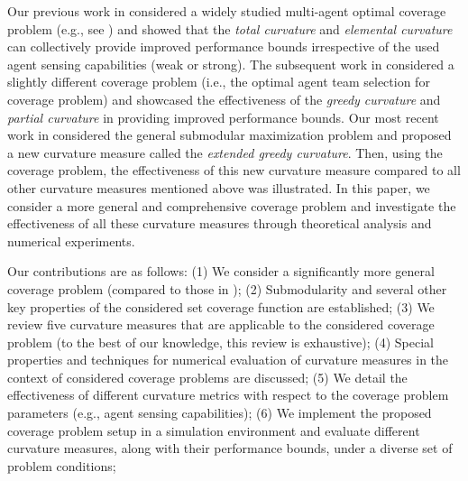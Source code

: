 \documentclass[letterpaper, 10 pt, conference]{ieeeconf}
\begin{document}
Our previous work in \cite{Sun2019} considered a widely studied multi-agent optimal coverage problem (e.g., see \cite{Zhong2011,Welikala2019J1}) and showed that the \emph{total curvature} \cite{Conforti1984} and \emph{elemental curvature} \cite{Wang2016} can collectively provide improved performance bounds irrespective of the used agent sensing capabilities (weak or strong). The subsequent work in \cite{Sun2020} considered a slightly different coverage problem (i.e., the optimal agent team selection for coverage problem) and showcased the effectiveness of the \emph{greedy curvature} \cite{Conforti1984} and \emph{partial curvature} \cite{Liu2018} in providing improved performance bounds. Our most recent work in \cite{WelikalaJ02021} considered the general submodular maximization problem and proposed a new curvature measure called the \emph{extended greedy curvature}. Then, using the coverage problem, the effectiveness of this new curvature measure compared to all other curvature measures mentioned above was illustrated. 
In this paper, we consider a more general and comprehensive coverage problem and investigate the effectiveness of all these curvature measures through theoretical analysis and numerical experiments. 
   


Our contributions are as follows: 
(1) We consider a significantly more general coverage problem (compared to those in \cite{WelikalaJ02021,Sun2019});
(2) Submodularity and several other key properties of the considered set coverage function are established; 
(3) We review five curvature measures that are applicable to the considered coverage problem (to the best of our knowledge, this review is exhaustive);
(4) Special properties and techniques for numerical evaluation of curvature measures in the context of considered coverage problems are discussed; 
(5) We detail the effectiveness of different curvature metrics with respect to the coverage problem parameters (e.g., agent sensing capabilities);
(6) We implement the proposed coverage problem setup in a simulation environment and evaluate different curvature measures, along with their performance bounds, under a diverse set of problem conditions;
\end{document}
